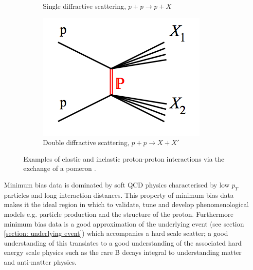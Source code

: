 \begin{figure}[h]
\begin{subfigure}[h]{0.32\textwidth}
		\caption{Single diffractive scattering, $p + p \rightarrow p + X$}
		\label{fig: proton-proton interactions - single diffractive scattering}
	\end{subfigure}
	\begin{subfigure}[h]{0.32\textwidth}
		\includegraphics[width=\textwidth]{./Chapters/theory/minimum_bias/images/double_diffractive.png}
		\caption{Double diffractive scattering, $p + p \rightarrow X + X'$}
		\label{fig: proton-proton interactions - double diffractive scattering}
	\end{subfigure}
	\caption{Examples of elastic and inelastic proton-proton interactions via the exchange of a pomeron \cite{Kwiecinski:314736}.}
	\label{fig: elastic and inelastic proton-proton scattering}
\end{figure}

Minimum bias data is dominated by soft QCD physics characterised by low $p_T$ particles and long interaction distances. This property of minimum bias data makes it the ideal region in which to validate, tune and develop phenomenological models e.g. particle production and the structure of the proton. Furthermore minimum bias data is a good approximation of the underlying event (see section \ref{section: underlying event}) which accompanies a hard scale scatter; a good understanding of this translates to a good understanding of the associated hard energy scale physics such as the rare B decays integral to understanding matter and anti-matter physics.
